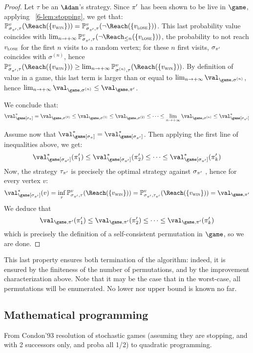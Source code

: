 \begin{proof}
Let $\tau$ be an $\Adam$'s strategy. Since $\pi'$ has been shown to
be live in $\game$, applying ~\cref{6-lem:stopping}, we
get that: $\probm^v_{\sigma_{\perm'},\tau} (\Reach(\{\vwin\})) =
\probm^v_{\sigma_{\perm'},\tau} (\neg\Reach(\{\vlose\}))$. This last
probability value coincides with $\lim_{n \to +\infty}
\probm^v_{\sigma_{\perm'},\tau} (\neg\Reach_{\le n}(\{\vlose\}))$,
the probability to not reach $v_{\textsc{lose}}$ for the first $n$ visits to a
random vertex; for these $n$ first visits, $\sigma_{\pi'}$
coincides with $\sigma^{(n)}$, hence
$\probm^v_{\sigma_{\perm'},\tau} (\Reach(\{\vwin\})) \ge \lim_{n\to
+\infty} \probm^v_{\sigma^{(n)},\tau} (\Reach(\{\vwin\}))$. By
definition of value in a game, this last term is larger than or
equal to $\lim_{n \to+\infty}\val_{\game,\sigma^{(n)}}$, hence
$\lim_{n \to+\infty}\val_{\game,\sigma^{(n)}} \le
\val_{\game,\perm'}$.

We conclude that:
\[
\val^*_{\game[\sigma_\perm]} = \val_{\game,\sigma^{(0)}} \le
\val_{\game,\sigma^{(1)}} \le \val_{\game,\sigma^{(2)}} \le \dots\le
\lim_{n \to +\infty} \val_{\game,\sigma^{(n)}} \le
\val^*_{\game[\sigma_{\perm'}]}
\]

\medskip Assume now that $\val^*_{\game[\sigma_\perm]} =
\val^*_{\game[\sigma_{\perm'}]}$. Then applying the first line of
inequalities above, we get:
\[
\val^*_{\game[\sigma_{\perm'}]}(\perm'_1) \le
\val^*_{\game[\sigma_{\perm'}]}(\perm'_2) \le \dots \le
\val^*_{\game[\sigma_{\perm'}]}(\perm'_k)
\]
Now, the strategy $\tau_{\pi'}$ is precisely the optimal strategy
against $\sigma_{\pi'}$ , hence for every vertex $v$:
\[
\val^*_{\game[\sigma_{\perm'}]}(v) = \inf_\tau
\probm^v_{\sigma_{\perm'},\tau} (\Reach(\{\vwin\})) =
\probm^v_{\sigma_{\perm'},\tau_{\perm'}} (\Reach(\{\vwin\})) =
\val_{\game,\perm'}
\]
We deduce that
\[
\val_{\game,\perm'}(\perm'_1) \le \val_{\game,\perm'}(\perm'_2) \le
\dots \le \val_{\game,\perm'}(\perm'_k)
\]
which is precisely the definition of a self-consistent permutation
in $\game$, so we are done.
\end{proof}

This last property ensures both termination of the algorithm: indeed,
it is ensured by the finiteness of the number of permutations, and by
the improvement characterization above. Note that it may be the case
that in the worst-case, all permutations will be enumerated. No lower
nor upper bound is known no far.

\subsection{Mathematical programming}
From Condon'93 resolution of stochastic games (assuming they are
stopping, and with 2 successors only, and proba all 1/2) to quadratic
programming.
